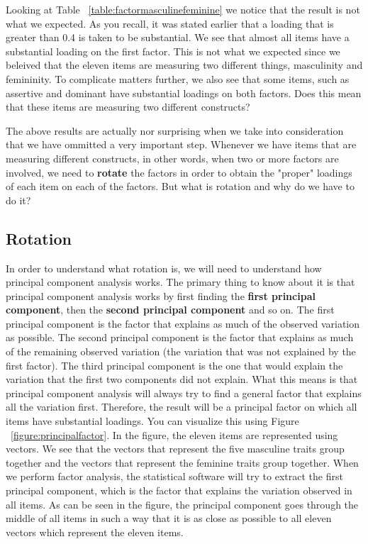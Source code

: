 \documentclass[a4paper,12pt,oneside]{book}
\begin{document}
Looking at Table ~\ref{table:factormasculinefeminine} we notice that the result is not what we expected. As you recall, it was stated earlier that
a loading that is greater than 0.4 is taken to be substantial. We see that almost all items have a substantial loading on the first factor. This
is not what we expected since we beleived that the eleven items are measuring two different things, masculinity and femininity. To complicate
matters further, we also see that some items, such as assertive and dominant have substantial loadings on both factors. Does this mean that these
items are measuring two different constructs? 

The above results are actually nor surprising when we take into consideration that we have ommitted a very important step. Whenever we have
items that are measuring different constructs, in other words, when two or more factors are involved, we need to \textbf{rotate} the factors
in order to obtain the "proper" loadings of each item on each of the factors. But what is rotation and why do we have to do it? 

\subsection{Rotation}
In order to understand what rotation is, we will need to understand how principal component analysis works. The primary thing to know about it is 
that principal component analysis works by first finding the \textbf{first principal component}, then the \textbf{second principal component} and
so on. The first principal component is the factor that explains as much of the observed variation as possible. The second principal component
is the factor that explains as much of the remaining observed variation (the variation that was not explained by the first factor). The third
principal component is the one that would explain the variation that the first two components did not explain. What this means is that principal
component analysis will always try to find a general factor that explains all the variation first. Therefore, the result will be a principal factor
on which all items have substantial loadings. You can visualize this using Figure ~\ref{figure:principalfactor}. In the figure, the eleven items are
represented using vectors. We see that the vectors that represent the five masculine traits group together and the vectors that represent the 
feminine traits group together. When we perform factor analysis, the statistical software will try to extract the first principal component, which
is the factor that explains the variation observed in all items. As can be seen in the figure, the principal component goes through the middle of
all items in such a way that it is as close as possible to all eleven vectors which represent the eleven items.   
\end{document}

